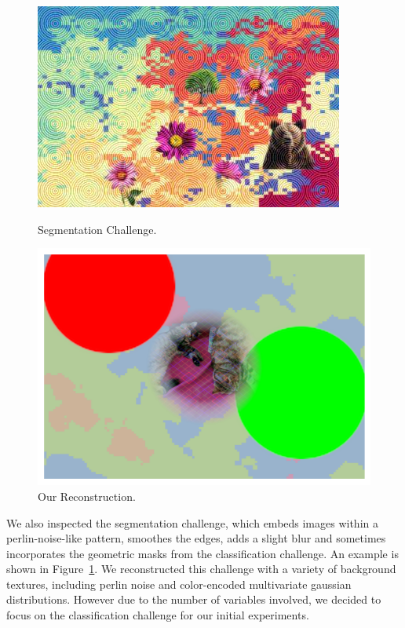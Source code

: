 \documentclass[a4paper, oneside]{discothesis}
\begin{document}
\begin{figure}[th]
	\begin{minipage}[t]{0.49\textwidth}\centering\includegraphics[width=\textwidth]{figures/hcaptcha-seg.png}\caption{Segmentation Challenge.}\end{minipage}
	\hfill
	\begin{minipage}[t]{0.49\textwidth}\centering\includegraphics[width=\textwidth]{figures/hcaptcha-seg-baiba.png}\caption{Our Reconstruction.}\end{minipage}
	\label{fig:segchallenge}
\end{figure}

We also inspected the segmentation challenge, which embeds images within a perlin-noise-like pattern, smoothes the edges, adds a slight blur and sometimes incorporates the geometric masks from the classification challenge. An example is shown in Figure~\ref{fig:segchallenge}. We reconstructed this challenge with a variety of background textures, including perlin noise and color-encoded multivariate gaussian distributions. However due to the number of variables involved, we decided to focus on the classification challenge for our initial experiments.
\end{document}

